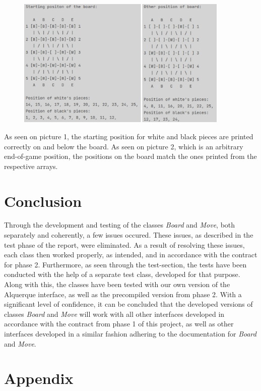 \documentclass[12pt, a4paper]{article}
\begin{document}
\begin{figure}[h]
	\centering
	\includegraphics[width=0.9\textwidth]{2in1.png}	
\end{figure}

As seen on picture 1, the starting position for white and black pieces are printed correctly on and below the board.
As seen on picture 2, which is an arbitrary end-of-game position, the positions on the board match the ones printed from the respective arrays.

\section{Conclusion}
Through the development and testing of the classes \emph{Board} and \emph{Move}, both separately and coherently, a few issues occured. These issues, as described in the test phase of the report, were eliminated. As a result of resolving these issues, each class then worked properly, as intended, and in accordance with the contract for phase 2. Furthermore, as seen through the test-section, the tests have been conducted with the help of a separate test class, developed for that purpose. Along with this, the classes have been tested with our own version of the Alquerque interface, as well as the precompiled version from phase 2. With a significant level of confidence, it can be concluded that the developed versions of classes \emph{Board} and \emph{Move} will work with all other interfaces developed in accordance with the contract from phase 1 of this project, as well as other interfaces developed in a similar fashion adhering to the documentation for \emph{Board} and \emph{Move}.


\newpage

\section{Appendix}
\end{document}
